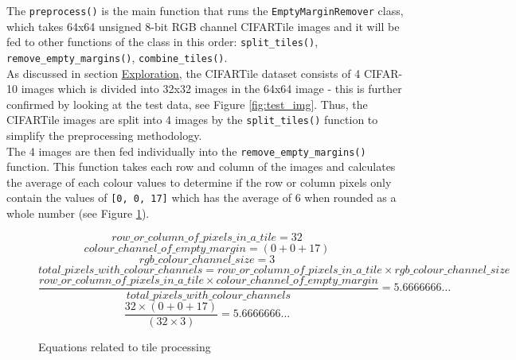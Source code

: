 \documentclass{article}
\begin{document}
The \texttt{preprocess()} is the main function that runs the 
\texttt{EmptyMarginRemover} class, which takes 64x64 unsigned 8-bit 
RGB channel CIFARTile images and it will be fed to other functions
of the class in this order:  \texttt{split\_tiles()}, \texttt{remove\_empty\_margins()},
\texttt{combine\_tiles()}.\\

As discussed in section \hyperref[exploration]{Exploration}, the CIFARTile
dataset consists of 4 CIFAR-10 images which is divided into 32x32 images in
the 64x64 image - this is further confirmed by looking at the test data, 
see Figure \ref{fig:test_img}. Thus, the CIFARTile images are split into
4 images by the \texttt{split\_tiles()} function to simplify the preprocessing
methodology.\\

The 4 images are then fed individually into the \texttt{remove\_empty\_margins()}
function. This function takes each row and column of the images and 
calculates the average of each colour values to determine if the row
or column pixels only contain the values of \texttt{[0, 0, 17]} which 
has the average of 6 when rounded as a whole number (see Figure
 \ref{fig:remove_margin_equation}).

\begin{figure}[H]
    \centering
    \captionsetup{justification=centering}
    \begin{equation}
        row\_or\_column\_of\_pixels\_in\_a\_tile = 32
    \end{equation}
    \begin{equation}
        colour\_channel\_of\_empty\_margin = (0 + 0 + 17)
    \end{equation}
    \begin{equation}
        rgb\_colour\_channel\_size = 3
    \end{equation}
    \begin{equation}
        total\_pixels\_with\_colour\_channels = row\_or\_column\_of\_pixels\_in\_a\_tile \times rgb\_colour\_channel\_size
    \end{equation}
    \begin{equation}
        \frac{row\_or\_column\_of\_pixels\_in\_a\_tile \times colour\_channel\_of\_empty\_margin}{total\_pixels\_with\_colour\_channels} = 5.6666666\ldots
    \end{equation}
    \begin{equation}
        \frac{32 \times (0 + 0 + 17)}{(32 \times 3)} = 5.6666666\ldots
    \end{equation}
    \caption{Equations related to tile processing}
    \label{fig:remove_margin_equation}
\end{figure}
\end{document}

